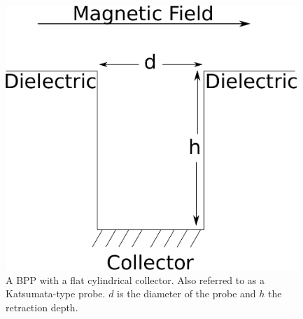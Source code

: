 \begin{figure}[H]
\centering
\includegraphics[height=10cm]{flat_collector.pdf}
\caption{A BPP with a flat cylindrical collector. Also referred to as a Katsumata-type probe. $d$ is the diameter of the probe and $h$ the retraction depth.} %
\label{fig:bpp_mechanism}
\end{figure}


